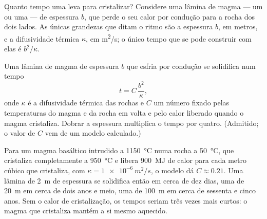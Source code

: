 Quanto tempo uma  leva para cristalizar? Considere uma lâmina de
magma --- um  ou uma  --- de espessura $b$, que perde o seu calor
por condução para a rocha dos dois lados. As únicas grandezas que ditam o
ritmo são a espessura $b$, em metros, e a difusividade térmica $\kappa$, em
\unit{m^2/s}; o único tempo que se pode construir com elas é $b^2/\kappa$.

\begin{proposition}\label{prop:g11:igneous-rocks:cooling}
Uma lâmina de magma de espessura $b$ que esfria por condução se solidifica
num tempo
\[
  t = C\,\frac{b^2}{\kappa},
\]
onde $\kappa$ é a difusividade térmica das rochas e $C$ um número fixado
pelas temperaturas do magma e da rocha em volta e pelo calor liberado
quando o magma cristaliza. Dobrar a espessura multiplica o tempo por quatro.
(Admitido; o valor de $C$ vem de um modelo calculado.)
\end{proposition}

Para um magma basáltico intrudido a \qty{1150}{\degreeCelsius} numa rocha a
\qty{50}{\degreeCelsius}, que cristaliza completamente a
\qty{950}{\degreeCelsius} e libera \qty{900}{MJ} de calor para cada metro
cúbico que cristaliza, com $\kappa = \qty{1e-6}{m^2/s}$, o modelo dá
$C \approx 0.21$. Uma lâmina de \qty{2}{m} de espessura se solidifica então
em cerca de dez dias, uma  de \qty{20}{m} em cerca de dois anos e
meio, uma de \qty{100}{m} em cerca de sessenta e cinco anos. Sem o calor de
cristalização, os tempos seriam três vezes mais curtos: o magma que
cristaliza mantém a si mesmo aquecido.

